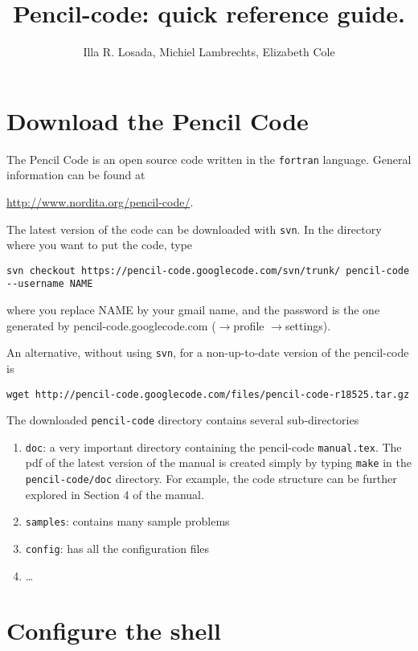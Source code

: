 \documentclass[a4paper,12pt]{article}
\title{Pencil-code: quick reference guide.}
\author{Illa R. Losada, Michiel Lambrechts, Elizabeth Cole}
\begin{document}
\maketitle

\tableofcontents

\newpage

\section{Download the Pencil Code}
The Pencil Code is an open source code written in the \verb|fortran| language. General information can be found at

\url{http://www.nordita.org/pencil-code/}.

The latest version of the code can be downloaded with \verb|svn|. In the
directory where you want to put the code, type
\begin{verbatim}
svn checkout https://pencil-code.googlecode.com/svn/trunk/ pencil-code
--username NAME
\end{verbatim}
where you replace NAME by your gmail name, and the password is the
one generated by pencil-code.googlecode.com ($\rightarrow$profile
$\rightarrow$settings). 

An alternative, without using \verb|svn|, for a non-up-to-date version of the pencil-code is
\begin{verbatim}
wget http://pencil-code.googlecode.com/files/pencil-code-r18525.tar.gz
\end{verbatim}

The downloaded \verb|pencil-code| directory contains several sub-directories
\begin{enumerate}
  \item \verb|doc|: a very important directory containing the pencil-code
    \verb|manual.tex|. The pdf of the latest version of the manual is created
    simply by typing \verb|make| in the \verb|pencil-code/doc| directory. For
    example, the code structure can be further explored in Section 4 of the
    manual.
  \item \verb|samples|: contains many sample problems
  \item \verb|config|: has all the configuration files
  \item \dots
\end{enumerate}

\section{Configure the shell}
\end{document}
